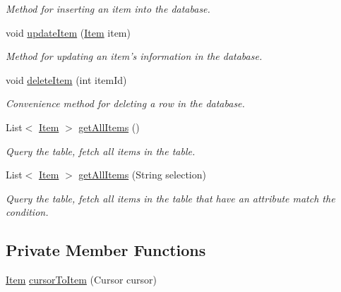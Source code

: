 \begin{DoxyCompactItemize}
\begin{DoxyCompactList}\small\item\em Method for inserting an item into the database. \end{DoxyCompactList}\item 
void \hyperlink{classvip2012_1_1g07_1_1shoppinglist_1_1ItemsDataSource_a89e56353e7301c70c6a3fa7ae8c98776}{update\-Item} (\hyperlink{classvip2012_1_1g07_1_1shoppinglist_1_1Item}{Item} item)
\begin{DoxyCompactList}\small\item\em Method for updating an item's information in the database. \end{DoxyCompactList}\item 
void \hyperlink{classvip2012_1_1g07_1_1shoppinglist_1_1ItemsDataSource_a5db93191fa502994fe32c410cdfedbda}{delete\-Item} (int item\-Id)
\begin{DoxyCompactList}\small\item\em Convenience method for deleting a row in the database. \end{DoxyCompactList}\item 
List$<$ \hyperlink{classvip2012_1_1g07_1_1shoppinglist_1_1Item}{Item} $>$ \hyperlink{classvip2012_1_1g07_1_1shoppinglist_1_1ItemsDataSource_a170631594944dfbe690b8354d04bac9f}{get\-All\-Items} ()
\begin{DoxyCompactList}\small\item\em Query the table, fetch all items in the table. \end{DoxyCompactList}\item 
List$<$ \hyperlink{classvip2012_1_1g07_1_1shoppinglist_1_1Item}{Item} $>$ \hyperlink{classvip2012_1_1g07_1_1shoppinglist_1_1ItemsDataSource_af2df438195f3a727e4e09c82071a9bb4}{get\-All\-Items} (String selection)
\begin{DoxyCompactList}\small\item\em Query the table, fetch all items in the table that have an attribute match the condition. \end{DoxyCompactList}\end{DoxyCompactItemize}
\subsection*{Private Member Functions}
\begin{DoxyCompactItemize}
\item 
\hyperlink{classvip2012_1_1g07_1_1shoppinglist_1_1Item}{Item} \hyperlink{classvip2012_1_1g07_1_1shoppinglist_1_1ItemsDataSource_a98483a85252ce38503df3d30003e02c0}{cursor\-To\-Item} (Cursor cursor)
\end{DoxyCompactItemize}
